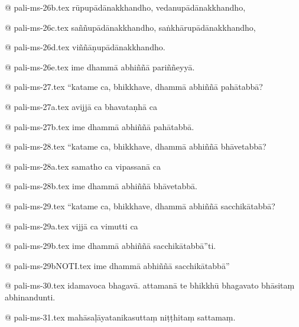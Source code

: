 @ pali-ms-26b.tex
rūpupādānakkhandho, vedanupādānakkhandho,

@ pali-ms-26c.tex
saññupādānakkhandho, saṅkhārupādānakkhandho,

@ pali-ms-26d.tex
viññāṇupādānakkhandho.

@ pali-ms-26e.tex
ime dhammā abhiññā pariññeyyā.

@ pali-ms-27.tex
“katame ca, bhikkhave, dhammā abhiññā pahātabbā?

@ pali-ms-27a.tex
avijjā ca bhavataṇhā ca

@ pali-ms-27b.tex
ime dhammā abhiññā pahātabbā.

@ pali-ms-28.tex
“katame ca, bhikkhave, dhammā abhiññā bhāvetabbā?

@ pali-ms-28a.tex
samatho ca vipassanā ca

@ pali-ms-28b.tex
ime dhammā abhiññā bhāvetabbā.

@ pali-ms-29.tex
“katame ca, bhikkhave, dhammā abhiññā sacchikātabbā?

@ pali-ms-29a.tex
vijjā ca vimutti ca

@ pali-ms-29b.tex
ime dhammā abhiññā sacchikātabbā”ti.

@ pali-ms-29bNOTI.tex
ime dhammā abhiññā sacchikātabbā”

@ pali-ms-30.tex
idamavoca bhagavā. attamanā te bhikkhū bhagavato bhāsitaṃ abhinandunti.

@ pali-ms-31.tex
mahāsaḷāyatanikasuttaṃ niṭṭhitaṃ sattamaṃ.
